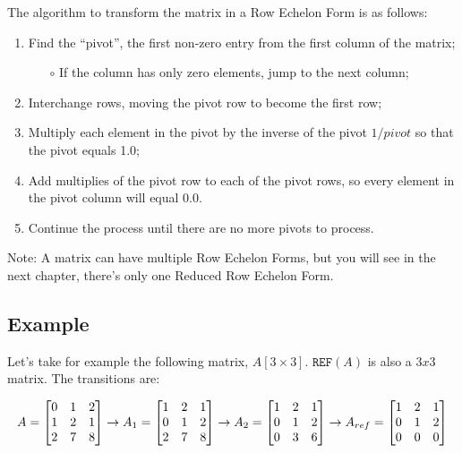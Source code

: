 The algorithm to transform the matrix in a Row Echelon Form is as follows:

\begin{enumerate}
\item Find the “pivot”, the first non-zero entry from the first column of the matrix;
	\begin{itemize}
	\item[$\circ$] If the column has only zero elements, jump to the next column;
	\end{itemize}
\item Interchange rows, moving the pivot row to become the first row;
\item Multiply each element in the pivot by the inverse of the pivot $1/{pivot}$
so that the pivot equals 1.0;
\item Add multiplies of the pivot row to each of the pivot rows, so every element in the pivot column will equal 0.0.
\item Continue the process until there are no more pivots to process.
\end{enumerate}

Note: A matrix can have multiple Row Echelon Forms, but you will see in the next chapter, there’s only one Reduced Row Echelon Form.

\subsection{Example}

Let’s take for example the following matrix, $A[3\times 3]$. $\texttt{REF}(A)$ is also a $3x3$ matrix. The transitions are:

$$
A=
\begin{bmatrix}
0 & 1 & 2 \\
1 & 2 & 1 \\
2 & 7 & 8
\end{bmatrix}
\rightarrow
A_{1}=
\begin{bmatrix}
1 & 2 & 1 \\
0 & 1 & 2 \\
2 & 7 & 8
\end{bmatrix}
\rightarrow
A_{2} =
\begin{bmatrix}
1 & 2 & 1 \\
0 & 1 & 2 \\
0 & 3 & 6
\end{bmatrix}
\rightarrow
\\
A_{ref}  =
\begin{bmatrix}
1 & 2 & 1 \\
0 & 1 & 2 \\
0 & 0 & 0
\end{bmatrix}
$$

